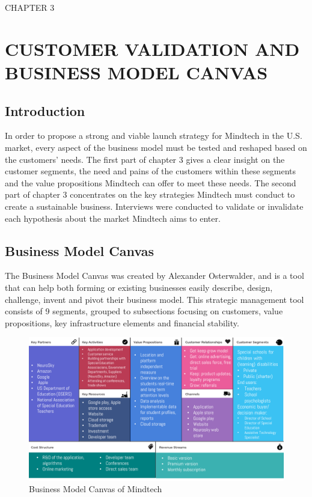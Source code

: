 \documentclass[letterpaper,10pt]{article}
\let\oldsection\section
\let\oldsubsection\subsection
\renewcommand{\section}{\def\cursectioning{section}\oldsection}
\renewcommand{\subsection}{\def\cursectioning{subsection}\oldsubsection}
\begin{document}
\newpage
\vspace{100mm}
\begin{center}
\uppercase{\Large{Chapter 3}}
\section{\uppercase{\large{Customer validation and business model canvas}}}
\vspace{20mm}
\end{center}


\subsection{Introduction}

In order to propose a strong and viable launch strategy for Mindtech in the U.S. market, every aspect of the business model must be tested and reshaped based on the customers’ needs. The first part of chapter 3 gives a clear insight on the customer segments, the need and pains of the customers within these segments and the value propositions Mindtech can offer to meet these needs.  The second part of chapter 3 concentrates on the key strategies Mindtech must conduct to create a sustainable business. Interviews were conducted to validate or invalidate each hypothesis about the market Mindtech aims to enter.


\subsection{Business Model Canvas}

The Business Model Canvas was created by Alexander Osterwalder, and is a tool that can help both forming or existing businesses easily describe, design, challenge, invent and pivot their business model. This strategic management tool consists of 9 segments, grouped to subsections focusing on customers, value propositions, key infrastructure elements and financial stability. 

\cite{canvas}

\begin{figure}[!htb]
\centering
\includegraphics[scale=0.5]{canvas.PNG}
\caption{Business Model Canvas of Mindtech}
\label{img:canvas}
\end{figure}
\end{document}
